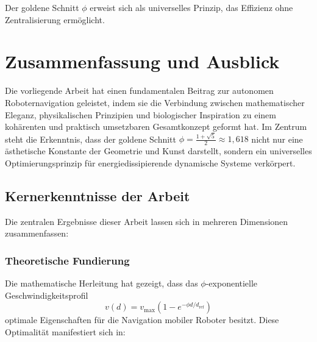 ﻿\documentclass[a4paper,12pt]{article}
\theoremstyle{definition}
\begin{document}
Der goldene Schnitt $\phi$ erweist sich als universelles Prinzip, das Effizienz ohne Zentralisierung ermöglicht.

\section{Zusammenfassung und Ausblick}

Die vorliegende Arbeit hat einen fundamentalen Beitrag zur autonomen Roboternavigation geleistet, indem sie die Verbindung zwischen mathematischer Eleganz, physikalischen Prinzipien und biologischer Inspiration zu einem kohärenten und praktisch umsetzbaren Gesamtkonzept geformt hat. Im Zentrum steht die Erkenntnis, dass der goldene Schnitt $\phi = \frac{1+\sqrt{5}}{2} \approx 1{,}618$ nicht nur eine ästhetische Konstante der Geometrie und Kunst darstellt, sondern ein universelles Optimierungsprinzip für energiedissipierende dynamische Systeme verkörpert.

\subsection{Kernerkenntnisse der Arbeit}

Die zentralen Ergebnisse dieser Arbeit lassen sich in mehreren Dimensionen zusammenfassen:

\subsubsection{Theoretische Fundierung}

Die mathematische Herleitung hat gezeigt, dass das $\phi$-exponentielle Geschwindigkeitsprofil
\begin{equation}
	v(d) = v_{\max}\left(1 - e^{-\phi d/d_{\text{ref}}}\right)
\end{equation}
optimale Eigenschaften für die Navigation mobiler Roboter besitzt. Diese Optimalität manifestiert sich in:
\end{document}
